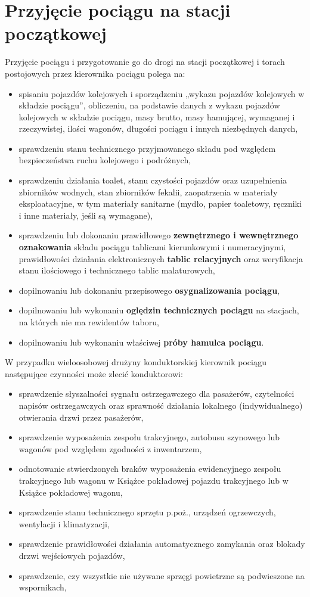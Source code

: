 \section{Przyjęcie pociągu na stacji początkowej}
Przyjęcie pociągu i przygotowanie go do drogi na stacji początkowej i torach
postojowych przez kierownika pociągu polega na:
\begin{itemize}
	\item spisaniu pojazdów kolejowych i sporządzeniu „wykazu pojazdów kolejowych w składzie pociągu”, obliczeniu, na podstawie danych z wykazu pojazdów kolejowych w składzie pociągu, masy brutto, masy hamującej, wymaganej i rzeczywistej, ilości wagonów, długości pociągu i innych niezbędnych danych,
	\item sprawdzeniu stanu technicznego przyjmowanego składu pod względem bezpieczeństwa ruchu kolejowego i podróżnych,
	\item sprawdzeniu działania toalet, stanu czystości pojazdów oraz uzupełnienia zbiorników wodnych, stan zbiorników fekalii, zaopatrzenia w materiały eksploatacyjne, w tym materiały sanitarne (mydło, papier toaletowy, ręczniki i inne materiały, jeśli są wymagane),
	\item sprawdzeniu lub dokonaniu prawidłowego \textbf{zewnętrznego i wewnętrznego oznakowania} składu pociągu tablicami kierunkowymi i numeracyjnymi,
	prawidłowości działania elektronicznych \textbf{tablic relacyjnych} oraz weryfikacja	stanu ilościowego i technicznego tablic malaturowych,
	\item dopilnowaniu lub dokonaniu przepisowego \textbf{osygnalizowania pociągu},
	\item dopilnowaniu lub wykonaniu \textbf{oględzin technicznych pociągu} na stacjach, na których nie ma rewidentów taboru,
	\item dopilnowaniu lub wykonaniu właściwej \textbf{próby hamulca pociągu}.
\end{itemize}

W przypadku wieloosobowej drużyny konduktorskiej kierownik pociągu następujące czynności może zlecić konduktorowi:
\begin{itemize}
	\item sprawdzenie słyszalności sygnału ostrzegawczego dla pasażerów, czytelności napisów ostrzegawczych oraz sprawność działania lokalnego
	(indywidualnego) otwierania drzwi przez pasażerów,
	\item sprawdzenie wyposażenia zespołu trakcyjnego, autobusu szynowego lub wagonów pod względem zgodności z inwentarzem,
	\item odnotowanie stwierdzonych braków wyposażenia ewidencyjnego zespołu trakcyjnego lub wagonu w Książce pokładowej pojazdu trakcyjnego lub w
	Książce pokładowej wagonu,
	\item sprawdzenie stanu technicznego sprzętu p.poż., urządzeń ogrzewczych, wentylacji i klimatyzacji,
	\item sprawdzenie prawidłowości działania automatycznego zamykania oraz blokady drzwi wejściowych pojazdów,
	\item sprawdzenie, czy wszystkie nie używane sprzęgi powietrzne są podwieszone na wspornikach,
\end{itemize}

